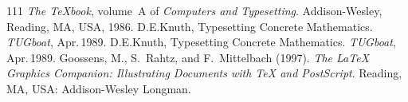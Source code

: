 \documentclass{article}
\begin{document}
	\pagebreak
	
	\begin{thebibliography}{111}
		 							\newblock \emph{The {\TeX}book}, volume~A of 				\emph{Computers and Typesetting}.
			Addison-Wesley, Reading, MA, USA, 1986.
			\newblock D.E.Knuth, Typesetting Concrete 					Mathematics. \emph{TUGboat}, Apr.\,1989.
			\newblock D.E.Knuth, Typesetting Concrete 					Mathematics. \emph{TUGboat}, Apr.\,1989.
			Goossens, M., S.~Rahtz, and F.~Mittelbach 					(1997). 
			\newblock \emph{The \LaTeX{} Graphics 						Companion: Illustrating Documents with 
			\TeX{} and PostScript}. 
			\newblock Reading, MA, USA:
			Addison-Wesley Longman.
	\end{thebibliography}
\end{document}
